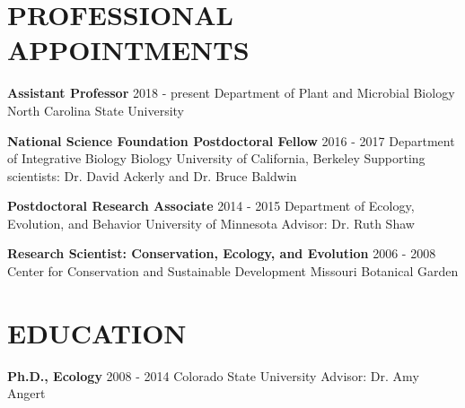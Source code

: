 \documentclass[11pt,english]{article}\usepackage[]{graphicx}\usepackage[]{color}
\begin{document}
\begin{flushleft}
\section*{PROFESSIONAL APPOINTMENTS}
\vspace{-0.5ex}

{\bf Assistant Professor} \hfill {2018 - present} \newline
Department of Plant and Microbial Biology \newline
North Carolina State University
\vspace{0.5ex}

{\bf National Science Foundation Postdoctoral Fellow} \hfill {2016 - 2017} \newline
Department of Integrative Biology Biology \newline
University of California, Berkeley \newline
Supporting scientists: Dr. David Ackerly and Dr. Bruce Baldwin
\vspace{0.5ex}

{\bf Postdoctoral Research Associate} \hfill {2014 - 2015} \newline
Department of Ecology, Evolution, and Behavior \newline
University of Minnesota \newline
Advisor: Dr. Ruth Shaw
\vspace{0.5ex}

{\bf Research Scientist: Conservation, Ecology, and Evolution} \hfill {2006 - 2008} \newline
Center for Conservation and Sustainable Development \newline
Missouri Botanical Garden


\vspace{1ex}
\section*{EDUCATION}
\vspace{-0.5ex}

{\bf Ph.D., Ecology} \hfill {2008 - 2014} \newline
Colorado State University \newline
Advisor: Dr. Amy Angert
\vspace{0.5ex}


\end{flushleft}
\end{document}
